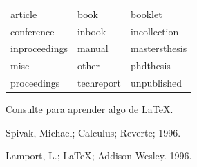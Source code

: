 \documentclass[letterpaper,12pt]{book}
\begin{document}
\begin{tabular}{lll}
article & book & booklet \\
conference & inbook & incollection \\
inproceedings & manual & mastersthesis \\
misc & other & phdthesis \\
proceedings & techreport & unpublished
\end{tabular}

Consulte \cite{Lamport} para aprender algo de \LaTeX{}.

%
%

\begin{thebibliography}{99}

 Spivak, Michael; Calculus; Reverte; 1996.

 Lamport, L.; \LaTeX{}; Addison-Wesley. 1996.

\end{thebibliography}
\end{document}
